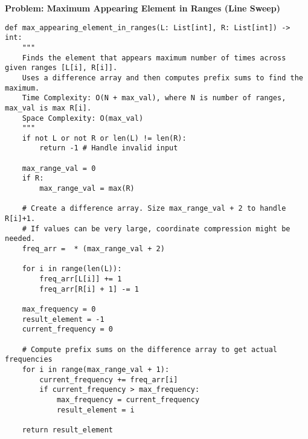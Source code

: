 \noindent\textbf{Problem: Maximum Appearing Element in Ranges (Line Sweep)}
\begin{verbatim}
def max_appearing_element_in_ranges(L: List[int], R: List[int]) -> int:
    """
    Finds the element that appears maximum number of times across given ranges [L[i], R[i]].
    Uses a difference array and then computes prefix sums to find the maximum.
    Time Complexity: O(N + max_val), where N is number of ranges, max_val is max R[i].
    Space Complexity: O(max_val)
    """
    if not L or not R or len(L) != len(R):
        return -1 # Handle invalid input
    
    max_range_val = 0
    if R:
        max_range_val = max(R)

    # Create a difference array. Size max_range_val + 2 to handle R[i]+1.
    # If values can be very large, coordinate compression might be needed.
    freq_arr =  * (max_range_val + 2) 

    for i in range(len(L)):
        freq_arr[L[i]] += 1
        freq_arr[R[i] + 1] -= 1
    
    max_frequency = 0
    result_element = -1
    current_frequency = 0

    # Compute prefix sums on the difference array to get actual frequencies
    for i in range(max_range_val + 1):
        current_frequency += freq_arr[i]
        if current_frequency > max_frequency:
            max_frequency = current_frequency
            result_element = i
            
    return result_element
\end{verbatim}


